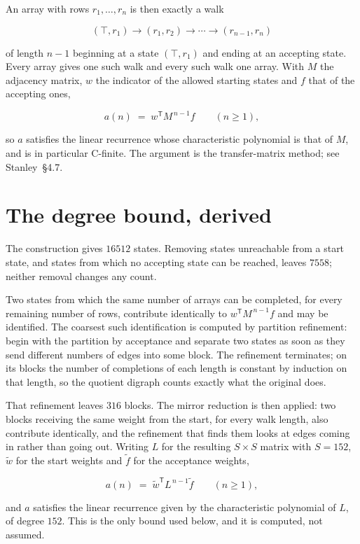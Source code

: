 \documentclass[11pt]{article}
\theoremstyle{definition}
\begin{document}
An array with rows $r_1,\dots,r_n$ is then exactly a walk

\[(\top,r_1) \to (r_1,r_2) \to \cdots \to (r_{n-1},r_n)\]

of length $n-1$ beginning at a state $(\top,r_1)$ and ending at an accepting state. Every array gives one such walk and every such walk one array. With $M$ the adjacency matrix, $w$ the indicator of the allowed starting states and $f$ that of the accepting ones,

\[a(n) \;=\; w^{\mathsf T} M^{\,n-1} f \qquad (n \ge 1),\]

so $a$ satisfies the linear recurrence whose characteristic polynomial is that of $M$, and is in particular C-finite. The argument is the transfer-matrix method; see Stanley~\S4.7.

\section{The degree bound, derived}

The construction gives $16512$ states. Removing states unreachable from a start state, and states from which no accepting state can be reached, leaves $7558$; neither removal changes any count.

Two states from which the same number of arrays can be completed, for every remaining number of rows, contribute identically to $w^{\mathsf T}M^{\,n-1}f$ and may be identified. The coarsest such identification is computed by partition refinement: begin with the partition by acceptance and separate two states as soon as they send different numbers of edges into some block. The refinement terminates; on its blocks the number of completions of each length is constant by induction on that length, so the quotient digraph counts exactly what the original does.

That refinement leaves $316$ blocks. The mirror reduction is then applied: two blocks receiving the same weight from the start, for every walk length, also contribute identically, and the refinement that finds them looks at edges coming in rather than going out. Writing $L$ for the resulting $S \times S$ matrix with $S = 152$, $\tilde w$ for the start weights and $\tilde f$ for the acceptance weights,

\[a(n) \;=\; \tilde w^{\mathsf T} L^{\,n-1} \tilde f \qquad (n \ge 1),\]

and $a$ satisfies the linear recurrence given by the characteristic polynomial of $L$, of degree $152$. This is the only bound used below, and it is computed, not assumed.
\end{document}
